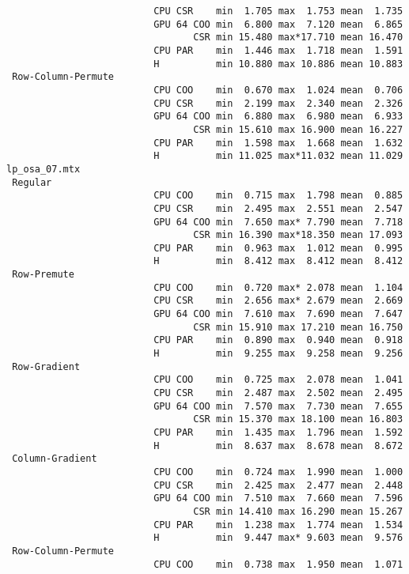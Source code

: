 \begin{verbatim}
                          CPU CSR    min  1.705 max  1.753 mean  1.735
                          GPU 64 COO min  6.800 max  7.120 mean  6.865
                                 CSR min 15.480 max*17.710 mean 16.470
                          CPU PAR    min  1.446 max  1.718 mean  1.591
                          H          min 10.880 max 10.886 mean 10.883
 Row-Column-Permute
                          CPU COO    min  0.670 max  1.024 mean  0.706
                          CPU CSR    min  2.199 max  2.340 mean  2.326
                          GPU 64 COO min  6.880 max  6.980 mean  6.933
                                 CSR min 15.610 max 16.900 mean 16.227
                          CPU PAR    min  1.598 max  1.668 mean  1.632
                          H          min 11.025 max*11.032 mean 11.029
lp_osa_07.mtx
 Regular
                          CPU COO    min  0.715 max  1.798 mean  0.885
                          CPU CSR    min  2.495 max  2.551 mean  2.547
                          GPU 64 COO min  7.650 max* 7.790 mean  7.718
                                 CSR min 16.390 max*18.350 mean 17.093
                          CPU PAR    min  0.963 max  1.012 mean  0.995
                          H          min  8.412 max  8.412 mean  8.412
 Row-Premute
                          CPU COO    min  0.720 max* 2.078 mean  1.104
                          CPU CSR    min  2.656 max* 2.679 mean  2.669
                          GPU 64 COO min  7.610 max  7.690 mean  7.647
                                 CSR min 15.910 max 17.210 mean 16.750
                          CPU PAR    min  0.890 max  0.940 mean  0.918
                          H          min  9.255 max  9.258 mean  9.256
 Row-Gradient
                          CPU COO    min  0.725 max  2.078 mean  1.041
                          CPU CSR    min  2.487 max  2.502 mean  2.495
                          GPU 64 COO min  7.570 max  7.730 mean  7.655
                                 CSR min 15.370 max 18.100 mean 16.803
                          CPU PAR    min  1.435 max  1.796 mean  1.592
                          H          min  8.637 max  8.678 mean  8.672
 Column-Gradient
                          CPU COO    min  0.724 max  1.990 mean  1.000
                          CPU CSR    min  2.425 max  2.477 mean  2.448
                          GPU 64 COO min  7.510 max  7.660 mean  7.596
                                 CSR min 14.410 max 16.290 mean 15.267
                          CPU PAR    min  1.238 max  1.774 mean  1.534
                          H          min  9.447 max* 9.603 mean  9.576
 Row-Column-Permute
                          CPU COO    min  0.738 max  1.950 mean  1.071

\end{verbatim}

